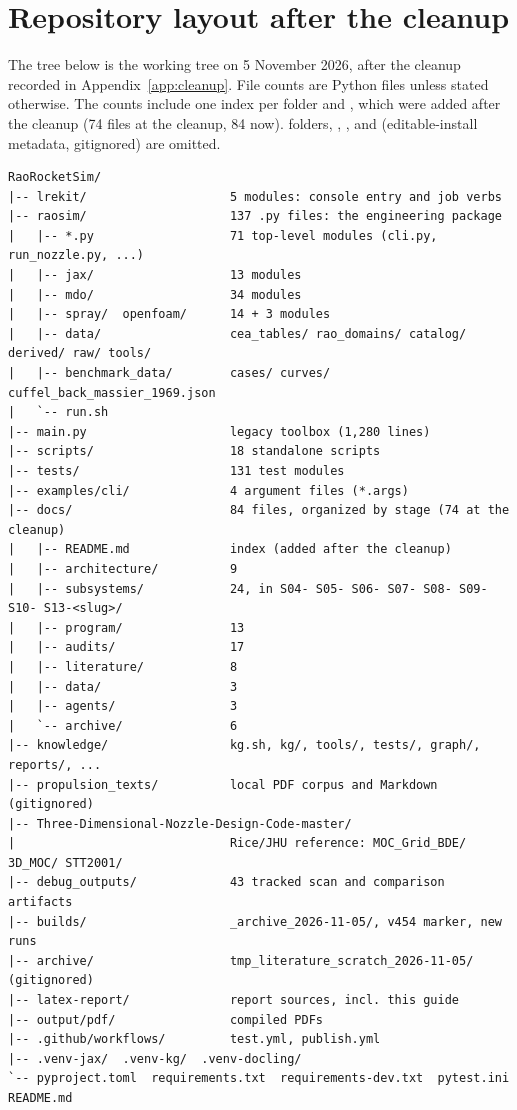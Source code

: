 \section{Repository layout after the cleanup}\label{sec:orient-layout}

The tree below is the working tree on 5 November 2026, after the cleanup recorded in Appendix~\ref{app:cleanup}. File counts are Python files unless stated otherwise. The  counts include one index  per folder and , which were added after the cleanup (74 files at the cleanup, 84 now).  folders, , ,  and  (editable-install metadata, gitignored) are omitted.

\begin{lstlisting}
RaoRocketSim/
|-- lrekit/                    5 modules: console entry and job verbs
|-- raosim/                    137 .py files: the engineering package
|   |-- *.py                   71 top-level modules (cli.py, run_nozzle.py, ...)
|   |-- jax/                   13 modules
|   |-- mdo/                   34 modules
|   |-- spray/  openfoam/      14 + 3 modules
|   |-- data/                  cea_tables/ rao_domains/ catalog/ derived/ raw/ tools/
|   |-- benchmark_data/        cases/ curves/ cuffel_back_massier_1969.json
|   `-- run.sh
|-- main.py                    legacy toolbox (1,280 lines)
|-- scripts/                   18 standalone scripts
|-- tests/                     131 test modules
|-- examples/cli/              4 argument files (*.args)
|-- docs/                      84 files, organized by stage (74 at the cleanup)
|   |-- README.md              index (added after the cleanup)
|   |-- architecture/          9
|   |-- subsystems/            24, in S04- S05- S06- S07- S08- S09- S10- S13-<slug>/
|   |-- program/               13
|   |-- audits/                17
|   |-- literature/            8
|   |-- data/                  3
|   |-- agents/                3
|   `-- archive/               6
|-- knowledge/                 kg.sh, kg/, tools/, tests/, graph/, reports/, ...
|-- propulsion_texts/          local PDF corpus and Markdown (gitignored)
|-- Three-Dimensional-Nozzle-Design-Code-master/
|                              Rice/JHU reference: MOC_Grid_BDE/ 3D_MOC/ STT2001/
|-- debug_outputs/             43 tracked scan and comparison artifacts
|-- builds/                    _archive_2026-11-05/, v454 marker, new runs
|-- archive/                   tmp_literature_scratch_2026-11-05/ (gitignored)
|-- latex-report/              report sources, incl. this guide
|-- output/pdf/                compiled PDFs
|-- .github/workflows/         test.yml, publish.yml
|-- .venv-jax/  .venv-kg/  .venv-docling/
`-- pyproject.toml  requirements.txt  requirements-dev.txt  pytest.ini  README.md
\end{lstlisting}

